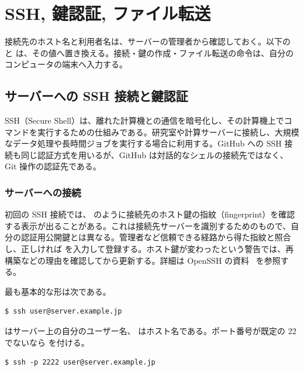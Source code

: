 \chapter{SSH, 鍵認証, ファイル転送}
\label{app:ssh}

接続先のホスト名と利用者名は、サーバーの管理者から確認しておく。以下の  と  は、その値へ置き換える。接続・鍵の作成・ファイル転送の命令は、自分のコンピュータの端末へ入力する。

\section{サーバーへの SSH 接続と鍵認証}

SSH（Secure Shell）は、離れた計算機との通信を暗号化し、その計算機上でコマンドを実行するための仕組みである。研究室や計算サーバーに接続し、大規模なデータ処理や長時間ジョブを実行する場合に利用する。GitHub への SSH 接続も同じ認証方式を用いるが、GitHub は対話的なシェルの接続先ではなく、Git 操作の認証先である。

\subsection{サーバーへの接続}

初回の SSH 接続では、 のように接続先のホスト鍵の指紋（fingerprint）を確認する表示が出ることがある。これは接続先サーバーを識別するためのもので、自分の認証用公開鍵とは異なる。管理者など信頼できる経路から得た指紋と照合し、正しければ  を入力して登録する。ホスト鍵が変わったという警告では、再構築などの理由を確認してから更新する。詳細は OpenSSH の資料~\cite{openssh_manual} を参照する。

最も基本的な形は次である。

\begin{lstlisting}[numbers=none, xleftmargin=2\zw]
$ ssh user@server.example.jp
\end{lstlisting}

 はサーバー上の自分のユーザー名、 はホスト名である。ポート番号が既定の 22 でないなら  を付ける。

\begin{lstlisting}[numbers=none, xleftmargin=2\zw]
$ ssh -p 2222 user@server.example.jp
\end{lstlisting}

